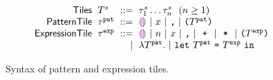 \begin{figure}
  \vspace{-3px}
  \[
  \arraycolsep=3pt\begin{array}{rlrl}
      \mathsf{Tiles} & \tiles^s & ::= & \tile^s_1\dots\tile^s_n\ \ \text{($n \geq 1$)} \\
      \mathsf{PatternTile} & \tile^{\pat} & ::= &
        \shole ~\vert~
        \svar{x} ~\vert~
        \sprod{}{} ~\vert~
        \sparen{\tiles^{\pat}}\\
      \mathsf{ExpressionTile} & \tile^{\expr} & ::= &
        \shole ~\vert~
        \snumlit{n} ~\vert~
        \svar{x} ~\vert~
        \sprod{}{} ~\vert~
        \splus{}{} ~\vert~
        \smult{}{} ~\vert~
        \sparen{\tiles^{\expr}} \\
      & & \vert &
        \slam{\tiles^{\pat}}{} ~\vert~
        \slet{\tiles^{\pat}}{\tiles^{\expr}}{} %
  \end{array}\]
  \caption{
    Syntax of pattern and expression tiles. 
  }
  \label{fig:tile-syntax}
\end{figure}

